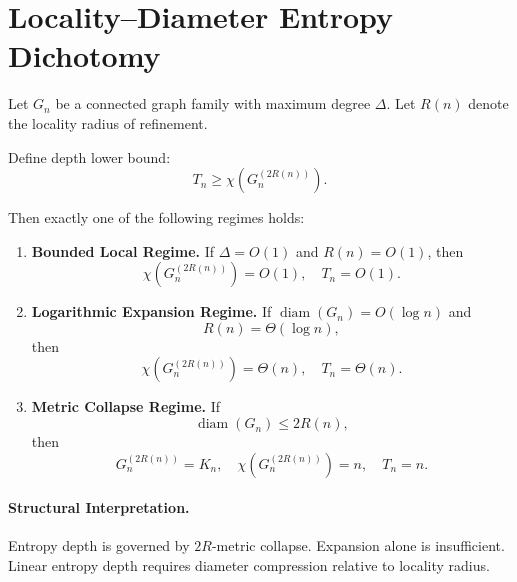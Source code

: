 \section{Locality–Diameter Entropy Dichotomy}

\begin{theorem}
Let $G_n$ be a connected graph family with maximum degree $\Delta$.
Let $R(n)$ denote the locality radius of refinement.

Define depth lower bound:
\[
T_n \ge \chi(G_n^{(2R(n))}).
\]

Then exactly one of the following regimes holds:

\begin{enumerate}
\item \textbf{Bounded Local Regime.}
If $\Delta = O(1)$ and $R(n)=O(1)$, then
\[
\chi(G_n^{(2R(n))}) = O(1),
\quad
T_n = O(1).
\]

\item \textbf{Logarithmic Expansion Regime.}
If $\operatorname{diam}(G_n)=O(\log n)$ and
\[
R(n)=\Theta(\log n),
\]
then
\[
\chi(G_n^{(2R(n))}) = \Theta(n),
\quad
T_n = \Theta(n).
\]

\item \textbf{Metric Collapse Regime.}
If
\[
\operatorname{diam}(G_n) \le 2R(n),
\]
then
\[
G_n^{(2R(n))} = K_n,
\quad
\chi(G_n^{(2R(n))}) = n,
\quad
T_n = n.
\]
\end{enumerate}
\end{theorem}

\paragraph{Structural Interpretation.}
Entropy depth is governed by $2R$-metric collapse.
Expansion alone is insufficient.
Linear entropy depth requires diameter compression relative to locality radius.
